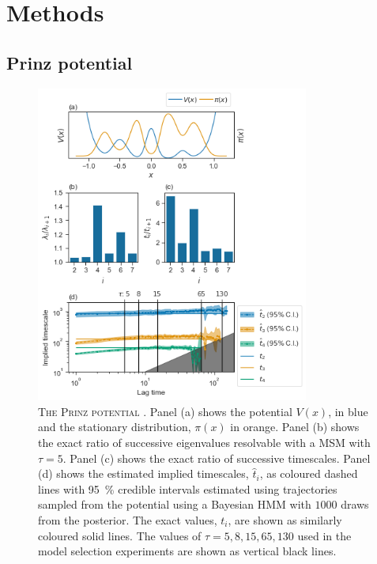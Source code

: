 \section{Methods} \label{sec:hmm_methods}
\subsection{Prinz potential}
\begin{figure}[p]
    \centering

    \includegraphics[width=0.8\textwidth]{chapters/hmm_selection/figures/prinz_pot.png}
    \caption[The Prinz potential]{\textsc{The Prinz potential} \cite{prinzMarkovModelsMolecular2011}. Panel (a) shows the potential $V(x)$, in blue and the stationary distribution, $\pi(x)$ in orange. Panel (b) shows the exact ratio of successive eigenvalues resolvable with a MSM with $\tau=5$. Panel (c) shows the exact ratio of successive timescales. Panel (d) shows the estimated implied timescales, $\hat{t}_{i}$, as coloured dashed lines with \SI{95}{\percent} credible intervals estimated using trajectories sampled from the potential using a Bayesian HMM with $1000$ draws from the posterior. The exact values, $t_{i}$, are shown as similarly coloured solid lines. The values of $\tau = 5, 8, 15, 65, 130$ used in the model selection experiments are shown as vertical black lines.}
    \label{fig:prinz_pot}
\end{figure}

